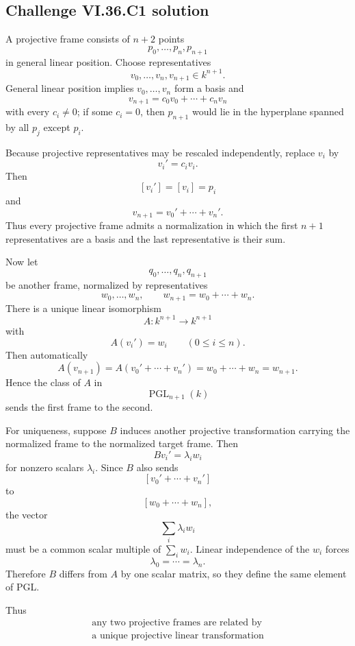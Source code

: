 
\subsection*{Challenge VI.36.C1 solution}
\begin{solution}
A projective frame consists of \(n+2\) points
\[
p_0,\ldots,p_n,p_{n+1}
\]
in general linear position. Choose representatives
\[
v_0,\ldots,v_n,v_{n+1}\in k^{n+1}.
\]
General linear position implies \(v_0,\ldots,v_n\) form a basis and
\[
v_{n+1}=c_0v_0+\cdots+c_nv_n
\]
with every \(c_i\neq0\); if some \(c_i=0\), then \(p_{n+1}\) would lie in the hyperplane spanned by all \(p_j\)
except \(p_i\).

Because projective representatives may be rescaled independently, replace \(v_i\) by
\[
v_i'=c_iv_i.
\]
Then
\[
[v_i']=[v_i]=p_i
\]
and
\[
v_{n+1}=v_0'+\cdots+v_n'.
\]
Thus every projective frame admits a normalization in which the first \(n+1\) representatives are a basis and the
last representative is their sum.

Now let
\[
q_0,\ldots,q_n,q_{n+1}
\]
be another frame, normalized by representatives
\[
w_0,\ldots,w_n,
\qquad
w_{n+1}=w_0+\cdots+w_n.
\]
There is a unique linear isomorphism
\[
A:k^{n+1}\to k^{n+1}
\]
with
\[
A(v_i')=w_i
\qquad(0\le i\le n).
\]
Then automatically
\[
A(v_{n+1})
=
A(v_0'+\cdots+v_n')
=
w_0+\cdots+w_n
=
w_{n+1}.
\]
Hence the class of \(A\) in
\[
\operatorname{PGL}_{n+1}(k)
\]
sends the first frame to the second.

For uniqueness, suppose \(B\) induces another projective transformation carrying the normalized frame to the
normalized target frame. Then
\[
Bv_i'=\lambda_i w_i
\]
for nonzero scalars \(\lambda_i\). Since \(B\) also sends
\[
[v_0'+\cdots+v_n']
\]
to
\[
[w_0+\cdots+w_n],
\]
the vector
\[
\sum_i\lambda_iw_i
\]
must be a common scalar multiple of \(\sum_iw_i\). Linear independence of the \(w_i\) forces
\[
\lambda_0=\cdots=\lambda_n.
\]
Therefore \(B\) differs from \(A\) by one scalar matrix, so they define the same element of PGL.

Thus
\[
\boxed{
\begin{gathered}
\text{any two projective frames are related by}\\
\text{a unique projective linear transformation}
\end{gathered}}
\]
\end{solution}

